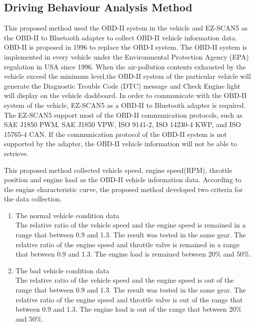 \subsection{Driving Behaviour Analysis Method}
This proposed method used the OBD-II system in the vehicle and EZ-SCAN5 as the OBD-II to Bluetooth adapter to collect OBD-II vehicle information data. OBD-II is proposed in 1996 to replace the OBD-I system. The OBD-II system is implemented in every vehicle under the Environmental Protection Agency (EPA) regulation in USA since 1996. When the air-pollution contents exhausted by the vehicle exceed the minimum level,the OBD-II system of the particular vehicle will generate the Diagnostic Trouble Code (DTC) message and Check Engine light will display on the vehicle dashboard. In order to communicate with the OBD-II system of the vehicle, EZ-SCAN5 as a OBD-II to Bluetooth adapter is required. The EZ-SCAN5 support most of the OBD-II communication protocols, such as SAE J1850 PWM, SAE J1850 VPW, ISO 9141-2, ISO 14230-4 KWP, and ISO 15765-4 CAN. If the communication protocol of the OBD-II system is not supported by the adapter, the OBD-II vehicle information will not be able to retrieve.

This proposed method collected vehicle speed, engine speed(RPM), throttle position and engine load as the OBD-II vehicle information data. According to the engine characteristic curve, the proposed method developed two criteria for the data collection.

\begin{enumerate}
\item The normal vehicle condition data \\
The relative ratio of the vehicle speed and the engine speed is remained in a range that between 0.9 and 1.3. The result was tested in the same gear. The relative ratio of the engine speed and throttle valve is remained in a range that between 0.9 and 1.3. The engine load is remained between 20\% and 50\%.  
\item The bad vehicle condition data \\
The relative ratio of the vehicle speed and the engine speed is out of the range that between 0.9 and 1.3. The result was tested in the same gear. The relative ratio of the engine speed and throttle valve is out of the range that between 0.9 and 1.3. The engine load is out of the range that between 20\% and 50\%.
\end{enumerate}

